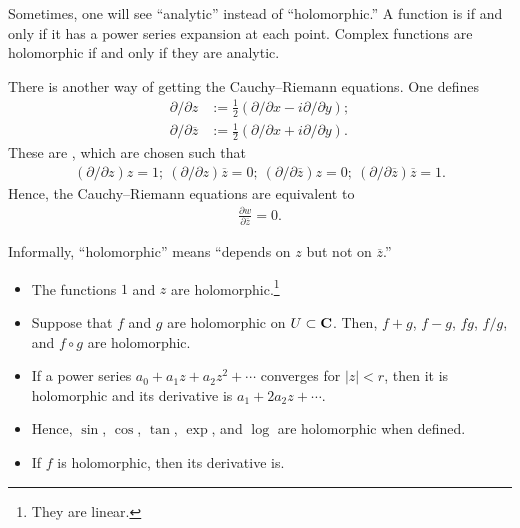 \documentclass[11pt, oneside,margin=1in]{article}
\begin{document}
\begin{remark}
	Sometimes, one will see ``analytic'' instead of ``holomorphic.'' A function is  if and only if it has a power series expansion at each point. Complex functions are holomorphic if and only if they are analytic. 
\end{remark}

There is another way of getting the Cauchy--Riemann equations. One defines
\begin{align*}
	\partial/\partial z &:= \frac{1}{2}(\partial/\partial x -  i\partial/\partial y);\\
		\partial/\partial \overline{z} &:= \frac{1}{2}(\partial/\partial x + i \partial/\partial y).
\end{align*}
These are , which are chosen such that 
\begin{align*}
	(\partial /\partial z)z = 1;\  (\partial /\partial z) \overline{z} = 0;\  (\partial /\partial \overline{z}) z = 0;\  (\partial /\partial \overline{z})\overline{z} =1. 
\end{align*}
Hence, the Cauchy--Riemann equations are equivalent to
\begin{align*}
	\frac{\partial w}{\partial \overline{z}} = 0.
\end{align*}

\begin{remark}
Informally, ``holomorphic'' means ``depends on $z$ but not on $\overline{z}$.'' 
\end{remark}

\begin{example}\label{}\text{}
\begin{itemize}
	\item The functions  $1$ and $z$ are holomorphic.\footnote{They are linear.}
	\item Suppose that $f$ and $g$ are holomorphic on $U\subset \mathbf C$. Then, $f+g$, $f-g$, $fg$, $f/g$, and $f\circ g$ are holomorphic.
	\item If a power series $a_0 + a_1z + a_2z^2 + \cdots$ converges for $\left\lvert z \right\rvert <r$, then it is holomorphic and its derivative is $a_1 + 2a_2z + \cdots$.
	\item Hence, $\sin$, $\cos$, $\tan$, $\exp$, and $\log$ are holomorphic when defined.
	\item If $f$ is holomorphic, then its derivative is.
\end{itemize}
\end{example}
\end{document}
